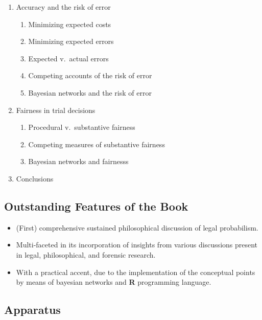 \documentclass[10pt,dvipsnames,enabledeprecatedfontcommands]{scrartcl}
\begin{document}
\begin{enumerate}
\begin{enumerate}
  \item  Accuracy and the risk of error
  \begin{enumerate}
  \item  Minimizing expected costs
  \item  Minimizing expected errors
  \item  Expected v.\ actual errors
  \item  Competing accounts of the risk of error
  \item  Bayesian networks and the risk of error
  \end{enumerate}



  \item  Fairness in trial decisions
  \begin{enumerate}
  \item  Procedural v.\ substantive fairness
  \item  Competing measures of substantive fairness
  \item  Bayesian networks and fairnesss
  \end{enumerate}


 

\item Conclusions
\end{enumerate}
\end{enumerate}

\hypertarget{outstanding-features-of-the-book}{%
\subsection{Outstanding Features of the
Book}\label{outstanding-features-of-the-book}}

\begin{itemize}
\item
  (First) comprehensive sustained philosophical discussion of legal
  probabilism.
\item
  Multi-faceted in its incorporation of insights from various
  discussions present in legal, philosophical, and forensic research.
\item
  With a practical accent, due to the implementation of the conceptual
  points by means of bayesian networks and \textbf{\textsf{R}}
  programming language.
\end{itemize}


\hypertarget{apparatus}{%
\subsection{Apparatus}\label{apparatus}}
\end{document}
